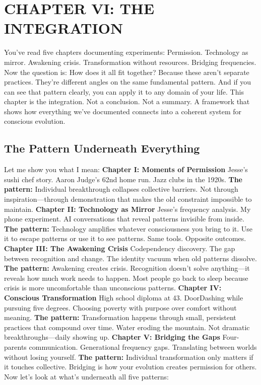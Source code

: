 \cleardoublepage

\chapter{CHAPTER VI: THE INTEGRATION}

You've read five chapters documenting experiments:
Permission. Technology as mirror. Awakening crisis. Transformation without resources. Bridging frequencies.
Now the question is: How does it all fit together?
Because these aren't separate practices. They're different angles on the same fundamental pattern. And if you can see that pattern clearly, you can apply it to any domain of your life.
This chapter is the integration.
Not a conclusion. Not a summary. A framework that shows how everything we've documented connects into a coherent system for conscious evolution.

\section{The Pattern Underneath Everything}

Let me show you what I mean:
\textbf{Chapter I: Moments of Permission}
Jesse's sushi chef story. Aaron Judge's 62nd home run. Jazz clubs in the 1920s.
\textbf{The pattern:} Individual breakthrough collapses collective barriers. Not through inspiration—through demonstration that makes the old constraint impossible to maintain.
\textbf{Chapter II: Technology as Mirror}
Jesse's frequency analysis. My phone experiment. AI conversations that reveal patterns invisible from inside.
\textbf{The pattern:} Technology amplifies whatever consciousness you bring to it. Use it to escape patterns or use it to see patterns. Same tools. Opposite outcomes.
\textbf{Chapter III: The Awakening Crisis}
Codependency discovery. The gap between recognition and change. The identity vacuum when old patterns dissolve.
\textbf{The pattern:} Awakening creates crisis. Recognition doesn't solve anything—it reveals how much work needs to happen. Most people go back to sleep because crisis is more uncomfortable than unconscious patterns.
\textbf{Chapter IV: Conscious Transformation}
High school diploma at 43. DoorDashing while pursuing five degrees. Choosing poverty with purpose over comfort without meaning.
\textbf{The pattern:} Transformation happens through small, persistent practices that compound over time. Water eroding the mountain. Not dramatic breakthroughs—daily showing up.
\textbf{Chapter V: Bridging the Gaps}
Four-parents communication. Generational frequency gaps. Translating between worlds without losing yourself.
\textbf{The pattern:} Individual transformation only matters if it touches collective. Bridging is how your evolution creates permission for others.
Now let's look at what's underneath all five patterns:

